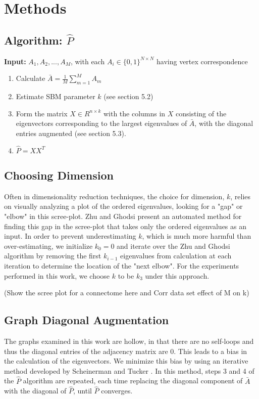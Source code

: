 \section{Methods}
	\subsection{Algorithm: $\hat{P}$}
	\textbf{Input:} $A_1, A_2,..., A_M$, with each $A_i \in \{0,1\}^{N \times N}$ having vertex correspondence
	\begin{enumerate}
		\item Calculate $\bar{A} = \frac{1}{M}\sum\limits_{m = 1}^M A_m$
		\item Estimate SBM parameter $k$ (see section 5.2)
		\item Form the matrix $X \in R^{n \times k}$ with the columns in $X$ consisting of the eigenvectors corresponding to the largest eigenvalues of $\bar{A}$, with the diagonal entries augmented (see section 5.3).
		\item  $\hat{P} = XX^{T}$
	\end{enumerate}	
	\subsection{Choosing Dimension}
	Often in dimensionality reduction techniques, the choice for dimension, $k$, relies on visually analyzing a plot of the ordered eigenvalues, looking for a "gap" or "elbow" in this scree-plot.  Zhu and Ghodsi \cite{Zhu2006} present an automated method for finding this gap in the scree-plot that takes only the ordered eigenvalues as an input.  In order to prevent underestimating $k$, which is much more harmful than over-estimating, we initialize $k_0 = 0$ and iterate over the Zhu and Ghodsi algorithm by removing the first $k_{i-1}$ eigenvalues from calculation at each iteration to determine the location of the "next elbow".  For the experiments performed in this work, we choose $k$ to be $k_3$ under this approach.
	
	(Show the scree plot for a connectome here and Corr data set effect of M on k)
	
	\subsection{Graph Diagonal Augmentation}
	The graphs examined in this work are hollow, in that there are no self-loops and thus the diagonal entries of the adjacency matrix are 0.  This leads to a bias in the calculation of the eigenvectors.  We minimize this bias by using an iterative method developed by Scheinerman and Tucker \cite{Scheinerman2010}. In this method, steps 3 and 4 of the $\hat{P}$ algorithm are repeated, each time replacing the diagonal component of $\bar{A}$ with the diagonal of $\hat{P}$, until $\hat{P}$ converges.

